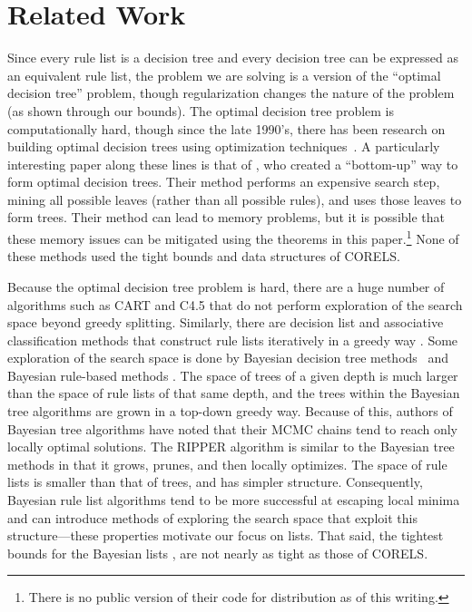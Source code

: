 \section{Related Work}

Since every rule list is a decision tree and every decision tree can be expressed as an equivalent rule list, the problem we are solving is a version of the ``optimal decision tree'' problem, though regularization changes the nature of the problem (as shown through our bounds). The optimal decision tree problem is computationally hard, though since the late 1990's, there has been research on building optimal decision trees using optimization techniques~\citep{Bennett96optimaldecision,dobkininduction,FarhangfarGZ08}. A particularly interesting paper along these lines is that of \citet{NijssenFromont2010}, who created a ``bottom-up'' way to form optimal decision trees. Their method performs an expensive search step, mining all possible leaves (rather than all possible rules), and uses those leaves to form trees. Their method can lead to memory problems, but it is possible that these memory issues can be mitigated using the theorems in this paper.\footnote{There is no public version of their code for distribution as of this writing.} None of these methods used the tight bounds and data structures of CORELS.

Because the optimal decision tree problem is hard, there are a huge number of algorithms such as CART \citep{Breiman84} and C4.5 \citep{Quinlan93} that do not perform exploration of the search space beyond greedy splitting. Similarly, there are decision list and associative classification methods that construct rule lists iteratively in a greedy way
\citep{Rivest87,Liu98,Li01,Yin03,Sokolova03,Marchand05,Vanhoof10,RudinLeMa13}.
Some exploration of the search space is done by Bayesian decision tree methods~\citep{Dension:1998hl,Chipman:2002hc,Chipman10} and Bayesian rule-based methods \citep{LethamRuMcMa15,YangRuSe16}. The space of trees of a given depth is much larger than the space of
rule lists of that same depth, and the trees within the Bayesian tree algorithms
are grown in a top-down greedy way. Because of this, authors of Bayesian tree algorithms have noted that their MCMC chains tend to reach only locally optimal solutions. 
The RIPPER algorithm \citep{ripper} is similar to the Bayesian tree methods in that it grows, prunes, and then locally optimizes.
%
The space of rule lists is smaller than that of trees, and has simpler structure.
%
Consequently, Bayesian rule list algorithms tend to be more successful at
escaping local minima and can introduce methods of exploring the search space
that exploit this structure---these properties motivate our focus on lists.
%
That said, the tightest bounds for the Bayesian lists \citep[namely, those of][upon whose work we build]{YangRuSe16},
are not nearly as tight as those of CORELS.

